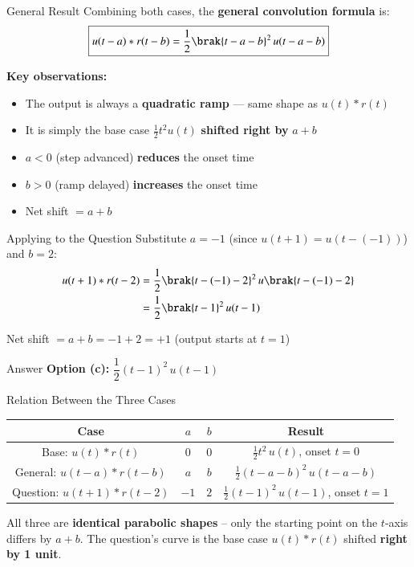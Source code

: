 \documentclass{beamer}
\begin{document}
\begin{frame}{General Result}
Combining both cases, the \textbf{general convolution formula} is:
\begin{align}
    \boxed{u(t-a) * r(t-b) = \frac{1}{2}\brak{t-a-b}^2\,u(t-a-b)}
\end{align}

\vspace{0.2cm}
\textbf{Key observations:}
\begin{itemize}
    \item The output is always a \textbf{quadratic ramp} — same shape as $u(t)*r(t)$
    \item It is simply the base case $\frac{1}{2}t^2 u(t)$ \textbf{shifted right by} $a+b$
    \item $a < 0$ (step advanced) \textbf{reduces} the onset time
    \item $b > 0$ (ramp delayed) \textbf{increases} the onset time
    \item Net shift $= a + b$
\end{itemize}
\end{frame}

\begin{frame}{Applying to the Question}
Substitute $a = -1$ (since $u(t+1) = u(t-(-1))$) and $b = 2$:
\begin{align}
    u(t+1) * r(t-2) &= \frac{1}{2}\brak{t-(-1)-2}^2\,u\brak{t-(-1)-2} \\
                    &= \frac{1}{2}\brak{t-1}^2\,u(t-1)
\end{align}

Net shift $= a + b = -1 + 2 = +1$ \quad (output starts at $t=1$)

\begin{block}{Answer}
\centering \textbf{Option (c):} $\dfrac{1}{2}(t-1)^2\,u(t-1)$
\end{block}
\end{frame}

\begin{frame}{Relation Between the Three Cases}
\begin{center}
\renewcommand{\arraystretch}{1.6}
\begin{tabular}{|c|c|c|c|}
\hline
\textbf{Case} & $a$ & $b$ & \textbf{Result} \\
\hline
Base: $u(t)*r(t)$ & $0$ & $0$ & $\frac{1}{2}t^2\,u(t)$, onset $t=0$ \\
\hline
General: $u(t-a)*r(t-b)$ & $a$ & $b$ & $\frac{1}{2}(t{-}a{-}b)^2\,u(t{-}a{-}b)$ \\
\hline
Question: $u(t+1)*r(t-2)$ & $-1$ & $2$ & $\frac{1}{2}(t-1)^2\,u(t-1)$, onset $t=1$ \\
\hline
\end{tabular}
\end{center}

\vspace{0.2cm}
All three are \textbf{identical parabolic shapes} -- only the starting point on the $t$-axis differs by $a+b$.
The question's curve is the base case $u(t)*r(t)$ shifted \textbf{right by 1 unit}.
\end{frame}
\end{document}
